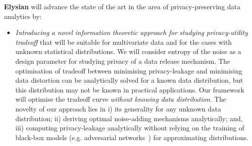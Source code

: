 \documentclass[a4paper,11pt]{article}
\newcommand{\project}[1]{\textbf{#1}\xspace}
\newcommand{\SECURITY}{\project{Elysian}}
\newcommand{\TheProject}{\SECURITY}
\begin{document}
\begin{mdframed}[backgroundcolor=gray!10]
\TheProject{} will advance the state of the art in the area of privacy-preserving data analytics by:
\begin{itemize}
\item \emph{Introducing a novel information theoretic approach for studying privacy-utility tradeoff} that will be suitable for multivariate data and for the cases with unknown statistical distributions. We will consider entropy of the noise as a design parameter for studying privacy of a data release mechanism. %
The optimisation of tradeoff between minimising privacy-leakage and minimising data distortion can be analytically solved for a known data distribution, but this distribution may not be known in practical applications. Our framework will optimise the tradeoff curve \emph{without knowing data distribution}. The novelty of our approach lies in i) its generality for any unknown data distribution; ii) deriving optimal noise-adding mechanisms analytically; and, iii) computing privacy-leakage analytically without relying on the training of black-box models (e.g. adversarial networks~\cite{8919758}) for approximating distributions. 
\end{itemize}

\end{mdframed}
  

\end{document}
